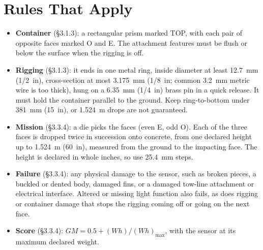 \documentclass[final]{dbfdoc}
\begin{document}
\section{Rules That Apply}
\begin{itemize}
\item \textbf{Container} (§3.1.3): a rectangular prism marked TOP, with each pair of opposite faces marked O and E. The attachment features must be flush or below the surface when the rigging is off.
\item \textbf{Rigging} (§3.1.3): it ends in one metal ring, inside diameter at least 12.7~mm (1/2~in), cross-section at most 3.175~mm (1/8~in; common 3.2~mm metric wire is too thick), hung on a 6.35~mm (1/4~in) brass pin in a quick release. It must hold the container parallel to the ground. Keep ring-to-bottom under 381~mm (15~in), or 1.524~m drops are not guaranteed.
\item \textbf{Mission} (§3.3.4): a die picks the faces (even E, odd O). Each of the three faces is dropped twice in succession onto concrete, from one declared height up to 1.524~m (60~in), measured from the ground to the impacting face. The height is declared in whole inches, so use 25.4~mm steps.
\item \textbf{Failure} (§3.3.4): any physical damage to the sensor, such as broken pieces, a buckled or dented body, damaged fins, or a damaged tow-line attachment or electrical interface. Altered or missing light function also fails, as does rigging or container damage that stops the rigging coming off or going on the next face.
\item \textbf{Score} (§3.3.4): $GM = 0.5 + (W h)/(W h)_\mathrm{max}$, with the sensor at its maximum declared weight.
\end{itemize}
\end{document}
